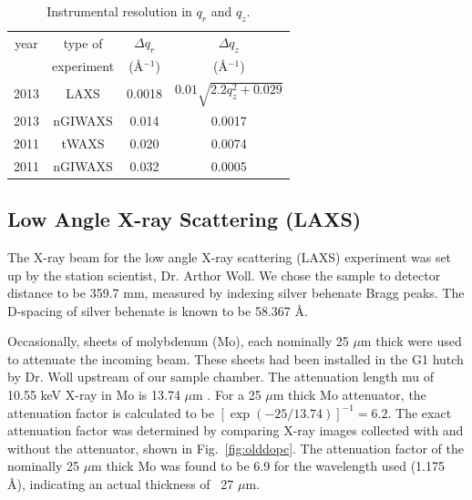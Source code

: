\begin{table}[htbp]
  \centering
  \begin{tabular}{cccc}
    \hline
    year & type of  & $\Delta q_r$ & $\Delta q_z$ \\
       & experiment & (\AA$^{-1}$) & (\AA$^{-1}$) \\
    \hline
    2013 & LAXS    & 0.0018 & $0.01\sqrt{2.2q_z^2+0.029}$ \\
    2013 & nGIWAXS & 0.014 & 0.0017 \\
    2011 & tWAXS   & 0.020 & 0.0074 \\
    2011 & nGIWAXS & 0.032 & 0.0005\\ 
    \hline  
  \end{tabular}
  \caption[Instrumental resolution in $q_r$ and $q_z$]
  {Instrumental resolution in $q_r$ and $q_z$.}
  \label{tab:instrumental_resolution}
\end{table}


\newpage
\subsection{Low Angle X-ray Scattering (LAXS)}\label{sec:LAXS_method}
The X-ray beam for the low angle X-ray scattering (LAXS) experiment 
was set up by the station scientist, Dr. Arthor Woll.
We chose the sample to detector distance to be 359.7 mm, measured by indexing
silver behenate Bragg peaks. The D-spacing of silver behenate is known to be
58.367 \AA.

Occasionally, sheets of molybdenum (Mo), each nominally 25 $\mu$m 
thick were 
used to attenuate the incoming beam. 
These sheets had been installed in the G1 hutch by Dr. Woll upstream of our 
sample chamber.
The attenuation length \gls{mu} of 10.55 keV X-ray in Mo is 13.74 $\mu$m \cite{ref:cxro}.
For a 25 $\mu$m thick Mo attenuator, the attenuation factor is calculated to be
$[\exp(-25/13.74)]^{-1} = 6.2$. The exact attenuation factor was determined
by comparing X-ray images collected with and without the attenuator, 
shown in Fig.~\ref{fig:olddopc}.
The attenuation factor of the nominally 25 $\mu$m thick Mo was found to 
be 6.9 for the wavelength used (1.175 \AA), indicating an actual thickness
of ~27 $\mu$m. 

